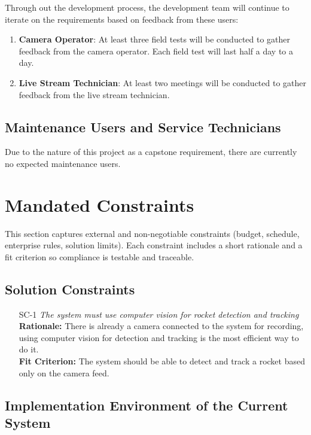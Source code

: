 \documentclass[12pt]{article}
\begin{document}
Through out the development process, the development team will continue to
iterate on the requirements based on feedback from these users:

\begin{enumerate}
  \item \textbf{Camera Operator}: At least three field tests will be conducted
        to gather feedback from the camera operator. Each field test will last
        half a day to a day.
  \item \textbf{Live Stream Technician}: At least two meetings will be conducted
        to gather feedback from the live stream technician.
\end{enumerate}

\subsection{Maintenance Users and Service Technicians}

Due to the nature of this project as a capstone requirement, there are
currently no expected maintenance users.

\section{Mandated Constraints}
This section captures external and non-negotiable constraints (budget,
schedule, enterprise rules, solution limits). Each constraint includes a short
rationale and a fit criterion so compliance is testable and traceable.
\subsection{Solution Constraints}

\begin{itemize}[leftmargin=*]
  \item[SC-1] \emph{The system must use computer vision for rocket detection and
          tracking}\\[2mm]
        \textbf{Rationale:} There is already a camera connected to the system for recording, using computer vision for detection and tracking is the most efficient way to do it. \\
        \textbf{Fit Criterion:} The system should be able to detect and track a rocket based only on the camera feed.
\end{itemize}

\subsection{Implementation Environment of the Current System}
\end{document}
